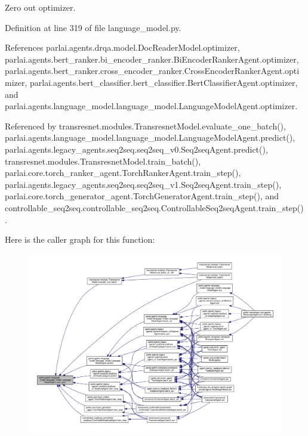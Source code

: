 \begin{DoxyVerb}Zero out optimizer.\end{DoxyVerb}
 

Definition at line 319 of file language\+\_\+model.\+py.



References parlai.\+agents.\+drqa.\+model.\+Doc\+Reader\+Model.\+optimizer, parlai.\+agents.\+bert\+\_\+ranker.\+bi\+\_\+encoder\+\_\+ranker.\+Bi\+Encoder\+Ranker\+Agent.\+optimizer, parlai.\+agents.\+bert\+\_\+ranker.\+cross\+\_\+encoder\+\_\+ranker.\+Cross\+Encoder\+Ranker\+Agent.\+optimizer, parlai.\+agents.\+bert\+\_\+classifier.\+bert\+\_\+classifier.\+Bert\+Classifier\+Agent.\+optimizer, and parlai.\+agents.\+language\+\_\+model.\+language\+\_\+model.\+Language\+Model\+Agent.\+optimizer.



Referenced by transresnet.\+modules.\+Transresnet\+Model.\+evaluate\+\_\+one\+\_\+batch(), parlai.\+agents.\+language\+\_\+model.\+language\+\_\+model.\+Language\+Model\+Agent.\+predict(), parlai.\+agents.\+legacy\+\_\+agents.\+seq2seq.\+seq2seq\+\_\+v0.\+Seq2seq\+Agent.\+predict(), transresnet.\+modules.\+Transresnet\+Model.\+train\+\_\+batch(), parlai.\+core.\+torch\+\_\+ranker\+\_\+agent.\+Torch\+Ranker\+Agent.\+train\+\_\+step(), parlai.\+agents.\+legacy\+\_\+agents.\+seq2seq.\+seq2seq\+\_\+v1.\+Seq2seq\+Agent.\+train\+\_\+step(), parlai.\+core.\+torch\+\_\+generator\+\_\+agent.\+Torch\+Generator\+Agent.\+train\+\_\+step(), and controllable\+\_\+seq2seq.\+controllable\+\_\+seq2seq.\+Controllable\+Seq2seq\+Agent.\+train\+\_\+step().

Here is the caller graph for this function\+:
\nopagebreak
\begin{figure}[H]
\begin{center}
\leavevmode
\includegraphics[width=350pt]{classparlai_1_1agents_1_1language__model_1_1language__model_1_1LanguageModelAgent_ad7b6363acdfb3d009cd9a3bcc6206faf_icgraph}
\end{center}
\end{figure}


